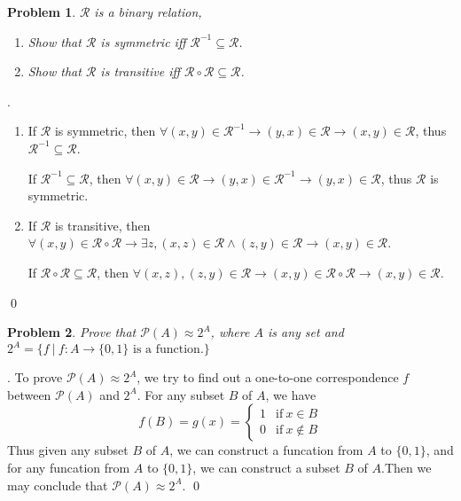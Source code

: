 \documentclass[12pt]{article}
\newtheorem{hw}{Problem}
\newenvironment{sol}
{\par\vspace{3mm}\noindent{\it Solution}.}
{\qed}
\begin{document}
	
	\begin{hw} $\mathcal{R}$ is a binary relation,
		\begin{enumerate}
			\item  Show that $\mathcal{R}$ is symmetric iff $\mathcal{R}^{-1}\subseteq \mathcal{R}$.
			\item  Show that $\mathcal{R}$ is transitive iff $\mathcal{R}\circ\mathcal{R} \subseteq \mathcal{R}$.
		\end{enumerate}
	\end{hw}
	\begin{sol}
		\begin{enumerate}
			\item If $\mathcal{R}$ is symmetric, then $\forall (x,y) \in \mathcal{R}^{-1} \longrightarrow (y,x) \in \mathcal{R} \longrightarrow (x,y) \in \mathcal{R}$, thus $\mathcal{R}^{-1}\subseteq \mathcal{R}$.
			
			If $\mathcal{R}^{-1}\subseteq \mathcal{R}$, then $\forall (x,y) \in \mathcal{R} \longrightarrow (y,x) \in \mathcal{R}^{-1} \longrightarrow (y,x) \in \mathcal{R}$, thus $\mathcal{R}$ is symmetric.
			
			\item If $\mathcal{R}$ is transitive, then $\forall (x,y) \in \mathcal{R}\circ\mathcal{R} \longrightarrow \exists z,(x,z) \in \mathcal{R} \land (z,y) \in \mathcal{R} \longrightarrow (x,y) \in \mathcal{R}$.
			
			If $\mathcal{R}\circ\mathcal{R} \subseteq \mathcal{R}$, then $\forall (x,z), (z,y) \in \mathcal{R} \longrightarrow (x,y) \in \mathcal{R}\circ\mathcal{R} \longrightarrow (x,y) \in \mathcal{R}$.
		\end{enumerate}
	\end{sol}
	
	
	\begin{hw}
		Prove that $\mathcal{P}(A)\approx 2^{A}$, where $A$ is any set and $2^{A}=\{f ~|~ f:A\rightarrow \{0,1\} \text{~is a function}.\}$
	\end{hw}
	\begin{sol}
		To prove $\mathcal{P}(A)\approx 2^{A}$, we try to find out a one-to-one correspondence $f$ between $\mathcal{P}(A)$ and $2^{A}$. For any subset $B$ of $A$, we have $$f(B) = g(x) = \left\{\begin{array}{ll}
		1 & \mathrm{if}\  x \in B \\
		0 & \mathrm{if}\  x \notin B
		\end{array} \right.$$ Thus given any subset $B$ of $A$, we can construct a funcation from $A$ to $\{0,1\}$, and for any funcation from $A$ to $\{0,1\}$, we can construct a subset $B$ of $A$.Then we may conclude that $\mathcal{P}(A)\approx 2^{A}$.
	\end{sol}
	
\end{document}

